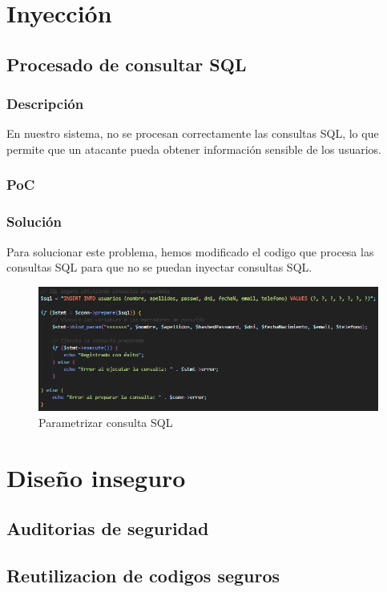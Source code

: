 \documentclass{report}
\begin{document}
        \section{Inyección}
            \subsection{Procesado de consultar SQL}
                \subsubsection{Descripción}
                    En nuestro sistema, no se procesan correctamente las consultas SQL, lo que permite que un atacante pueda obtener información sensible de los usuarios.
                \subsubsection{PoC}
                \subsubsection{Solución}
                    Para solucionar este problema, hemos modificado el codigo que procesa las consultas SQL para que no se puedan inyectar consultas SQL.
                    \begin{figure}[H]
                        \centering
                        \includegraphics[width=\textwidth]{./img/vulnerabilidades/3.3.1.1.png}
                        \caption{Parametrizar consulta SQL}
                    \end{figure}
        \clearpage
        \section{Diseño inseguro}
            \subsection{Auditorias de seguridad}
            \subsection{Reutilizacion de codigos seguros}
        \clearpage
\end{document}
